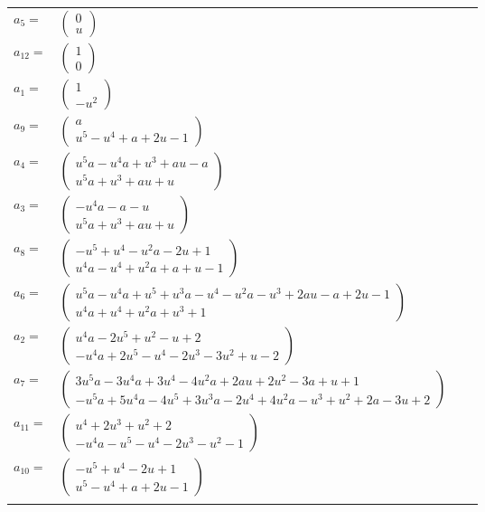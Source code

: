 \documentclass[1p]{elsarticle_modified}
\theoremstyle{definition}
\begin{document}
\begin{tabular}{m{7pt} m{180pt} m{7pt} m{180pt} }
\flushright $a_{5}=$&$\begin{pmatrix}0\\u\end{pmatrix}$ \\
\flushright $a_{12}=$&$\begin{pmatrix}1\\0\end{pmatrix}$ \\
\flushright $a_{1}=$&$\begin{pmatrix}1\\- u^2\end{pmatrix}$ \\
\flushright $a_{9}=$&$\begin{pmatrix}a\\u^5- u^4+a+2 u-1\end{pmatrix}$ \\
\flushright $a_{4}=$&$\begin{pmatrix}u^5 a- u^4 a+u^3+a u- a\\u^5 a+u^3+a u+u\end{pmatrix}$ \\
\flushright $a_{3}=$&$\begin{pmatrix}- u^4 a- a- u\\u^5 a+u^3+a u+u\end{pmatrix}$ \\
\flushright $a_{8}=$&$\begin{pmatrix}- u^5+u^4- u^2 a-2 u+1\\u^4 a- u^4+u^2 a+a+u-1\end{pmatrix}$ \\
\flushright $a_{6}=$&$\begin{pmatrix}u^5 a- u^4 a+u^5+u^3 a- u^4- u^2 a- u^3+2 a u- a+2 u-1\\u^4 a+u^4+u^2 a+u^3+1\end{pmatrix}$ \\
\flushright $a_{2}=$&$\begin{pmatrix}u^4 a-2 u^5+u^2- u+2\\- u^4 a+2 u^5- u^4-2 u^3-3 u^2+u-2\end{pmatrix}$ \\
\flushright $a_{7}=$&$\begin{pmatrix}3 u^5 a-3 u^4 a+3 u^4-4 u^2 a+2 a u+2 u^2-3 a+u+1\\- u^5 a+5 u^4 a-4 u^5+3 u^3 a-2 u^4+4 u^2 a- u^3+u^2+2 a-3 u+2\end{pmatrix}$ \\
\flushright $a_{11}=$&$\begin{pmatrix}u^4+2 u^3+u^2+2\\- u^4 a- u^5- u^4-2 u^3- u^2-1\end{pmatrix}$ \\
\flushright $a_{10}=$&$\begin{pmatrix}- u^5+u^4-2 u+1\\u^5- u^4+a+2 u-1\end{pmatrix}$\\&\end{tabular}
\end{document}

